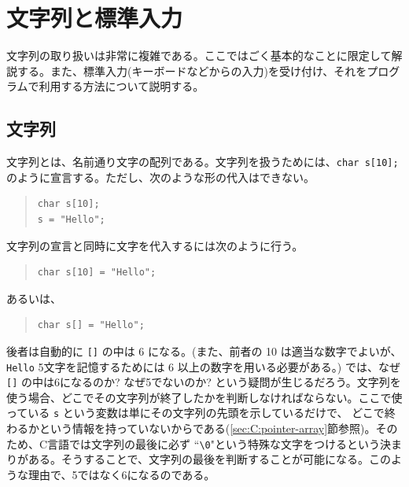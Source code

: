 \section{文字列と標準入力}
文字列の取り扱いは非常に複雑である。ここではごく基本的なことに限定して解説する。また、標準入力(キーボードなどからの入力)を受け付け、それをプログラムで利用する方法について説明する。

\subsection{文字列}
文字列とは、名前通り文字の配列である。文字列を扱うためには、\verb|char s[10];| のように宣言する。ただし、次のような形の代入はできない。
\begin{quote}
\begin{verbatim}
char s[10];
s = "Hello";
\end{verbatim}
\end{quote}
文字列の宣言と同時に文字を代入するには次のように行う。
\begin{quote}
\begin{verbatim}
char s[10] = "Hello";
\end{verbatim}
\end{quote}
あるいは、
\begin{quote}
\begin{verbatim}
char s[] = "Hello";
\end{verbatim}
\end{quote}
後者は自動的に \verb|[]| の中は 6 になる。(また、前者の 10 は適当な数字でよいが、\verb|Hello| 5文字を記憶するためには 6 以上の数字を用いる必要がある。) では、なぜ \verb|[]| の中は6になるのか? なぜ5でないのか? という疑問が生じるだろう。文字列を使う場合、どこでその文字列が終了したかを判断しなければならない。ここで使っている \verb|s| という変数は単にその文字列の先頭を示しているだけで、
どこで終わるかという情報を持っていないからである(\ref{sec:C:pointer-array}節参照)。そのため、C言語では文字列の最後に必ず ``\verb|\0|"という特殊な文字をつけるという決まりがある。そうすることで、文字列の最後を判断することが可能になる。このような理由で、5ではなく6になるのである。
\begin{figure}[H]
\begin{center}
\end{center}
\end{figure}

